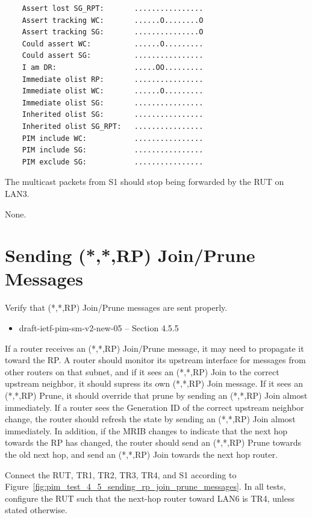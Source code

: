 \documentclass[11pt]{report}
\begin{document}
\begin{itemize}
\begin{verbatim}
    Assert lost SG_RPT:       ................
    Assert tracking WC:       ......O........O
    Assert tracking SG:       ...............O
    Could assert WC:          ......O.........
    Could assert SG:          ................
    I am DR:                  .....OO.........
    Immediate olist RP:       ................
    Immediate olist WC:       ......O.........
    Immediate olist SG:       ................
    Inherited olist SG:       ................
    Inherited olist SG_RPT:   ................
    PIM include WC:           ................
    PIM include SG:           ................
    PIM exclude SG:           ................
\end{verbatim}

  The multicast packets from S1 should stop being forwarded by the RUT on
  LAN3.

\end{itemize}

None.

\newpage
\section{Sending (*,*,RP) Join/Prune Messages}

Verify that (*,*,RP) Join/Prune messages are sent properly.

\begin{itemize}
  \item draft-ietf-pim-sm-v2-new-05 -- Section 4.5.5
\end{itemize}

If a router receives an (*,*,RP) Join/Prune message, it may need to propagate
it toward the RP. A router should monitor its upstream interface for messages
from other routers on that subnet, and if it sees an (*,*,RP) Join to the
correct upstream neighbor, it should supress its own (*,*,RP) Join message.
If it sees an (*,*,RP) Prune, it should override that prune by sending an
(*,*,RP) Join almost immediately. If a router sees the Generation ID of the
correct upstream neighbor change, the router should refresh the state by
sending an (*,*,RP) Join almost immediately. In addition, if the MRIB changes
to indicate that the next hop towards the RP has changed, the router should
send an (*,*,RP) Prune towards the old next hop, and send an (*,*,RP) Join
towards the next hop router.

Connect the RUT, TR1, TR2, TR3, TR4, and S1 according to
Figure~\ref{fig:pim_test_4_5_sending_rp_join_prune_messages}.
In all tests, configure the RUT such that the next-hop router toward LAN6 is
TR4, unless stated otherwise.
\end{document}

